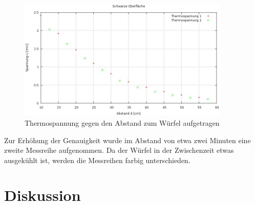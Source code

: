\begin{figure}[H]
\includegraphics[width=0.9\textwidth]{pics/temp_abstand.jpg}
\caption{Thermospannung gegen den Abstand zum Würfel aufgetragen}
\end{figure}

Zur Erhöhung der Genauigkeit wurde im Abstand von etwa zwei Minuten eine zweite Messreihe aufgenommen. Da der Würfel in der Zwischenzeit etwas ausgekühlt ist, werden die Messreihen farbig unterschieden.

\section{Diskussion}






